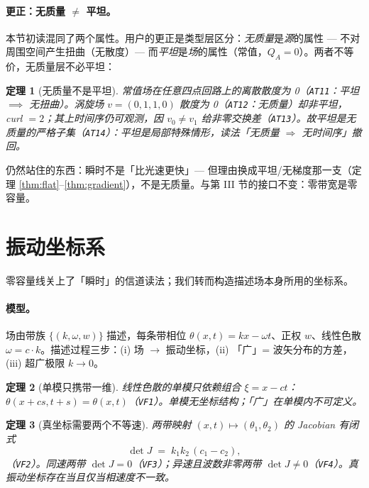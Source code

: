 \documentclass[aps,prd,preprint,superscriptaddress,amsmath,amssymb]{revtex4-2}
\newtheorem{theorem}{定理}[section]
\begin{document}
\paragraph{更正：无质量 $\ne$ 平坦。}
本节初读混同了两个属性。用户的更正是类型层区分：\emph{无质量}是\emph{源}的属性 --- 不对周围空间产生扭曲（无散度）--- 而\emph{平坦}是\emph{场}的属性（常值，$Q_A=0$）。两者不等价，无质量层不必平坦：

\begin{theorem}[无质量不是平坦]
\label{thm:contra}
常值场在任意四点回路上的离散散度为 0（\texttt{AT11}：平坦 $\implies$ 无扭曲）。涡旋场 $v=(0,1,1,0)$ 散度为 0（\texttt{AT12}：无质量）却非平坦，curl $=2$；其上时间序仍可观测，因 $v_0\ne v_1$ 给非零交换差（\texttt{AT13}）。故平坦是无质量的严格子集（\texttt{AT14}）：平坦是局部特殊情形，读法「无质量 $\Rightarrow$ 无时间序」撤回。
\end{theorem}

仍然站住的东西：瞬时不是「比光速更快」--- 但理由换成平坦/无梯度那一支（定理 \ref{thm:flat}--\ref{thm:gradient}），不是无质量。与第 III 节的接口不变：零带宽是零容量。

\section{振动坐标系}
\label{sec:vibration}

零容量线关上了「瞬时」的信道读法；我们转而构造描述场本身所用的坐标系。\paragraph{模型。}
场由带族 $\{(k,\omega,w)\}$ 描述，每条带相位 $\theta(x,t)=kx-\omega t$、正权 $w$、线性色散 $\omega=c\cdot k$。描述过程三步：(i) 场 $\to$ 振动坐标，(ii) 「广」= 波矢分布的方差，(iii) 超广极限 $k\to0$。

\begin{theorem}[单模只携带一维]
\label{thm:vf1}
线性色散的单模只依赖组合 $\xi=x-ct$：$\theta(x+cs,t+s)=\theta(x,t)$（\texttt{VF1}）。单模无坐标结构；「广」在单模内不可定义。
\end{theorem}

\begin{theorem}[真坐标需要两个不等速]
\label{thm:vf2}
两带映射 $(x,t)\mapsto(\theta_1,\theta_2)$ 的 Jacobian 有闭式
\begin{equation}
\det J \;=\; k_1k_2\,(c_1-c_2),
\label{eq:jac}
\end{equation}
（\texttt{VF2}）。同速两带 $\det J=0$（\texttt{VF3}）；异速且波数非零两带 $\det J\ne0$（\texttt{VF4}）。\emph{真振动坐标存在当且仅当相速度不一致。}
\end{theorem}
\end{document}
